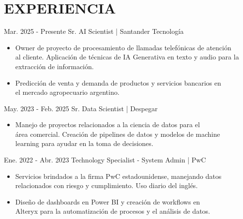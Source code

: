 \documentclass[]{friggeri-cv_reccius-experiment}
\begin{document}
\section{EXPERIENCIA}
\begin{entrylist}

  \entry
    {Mar. 2025 - Presente\space\space\enspace}
    {Sr. AI Scientist | }{{\small Santander Tecnología}}
    {}
    {\jobspace
    \vspace{0.1cm}
    \begin{itemize}[leftmargin=*, itemsep = 0.4em]
    \item Owner de proyecto de procesamiento de llamadas telefónicas de atención\\al cliente. Aplicación de técnicas de IA Generativa en texto y audio para la\\extracción de información.
    \item Predicción de venta y demanda de productos y servicios bancarios en\\el mercado agropecuario argentino.\\
    \end{itemize}
    \vspace{0.15cm}
    }
    
  \entry
    {May. 2023 - Feb. 2025\space\space\enspace}
    {Sr. Data Scientist | }{{\small Despegar}}
    {}
    {\jobspace
    \vspace{0.1cm}
    \begin{itemize}[leftmargin=*, itemsep = 0.4em]
    \item Manejo de proyectos relacionados a la ciencia de datos para el\\área comercial. Creación de pipelines de datos y modelos de machine\\learning para ayudar en la toma de decisiones.\\
    \end{itemize}
    \vspace{0.15cm}
    }
    
  \entry
    {Ene. 2022 - Abr. 2023\space\space\enspace}
    {Technology Specialist - System Admin | }{{\small PwC}}
    {}
    {\jobspace
    \vspace{0.1cm}
    \begin{itemize}[leftmargin=*, itemsep = 0.4em]
    \item Servicios brindados a la firma PwC estadounidense, manejando datos\\relacionados con riesgo y cumplimiento. Uso diario del inglés.
    \item Diseño de dashboards en Power BI y creación de workflows en\\Alteryx para la automatización de procesos y el análisis de datos.\\
    \end{itemize}
    \vspace{0.15cm}
    }
    

\end{entrylist}
\end{document}
